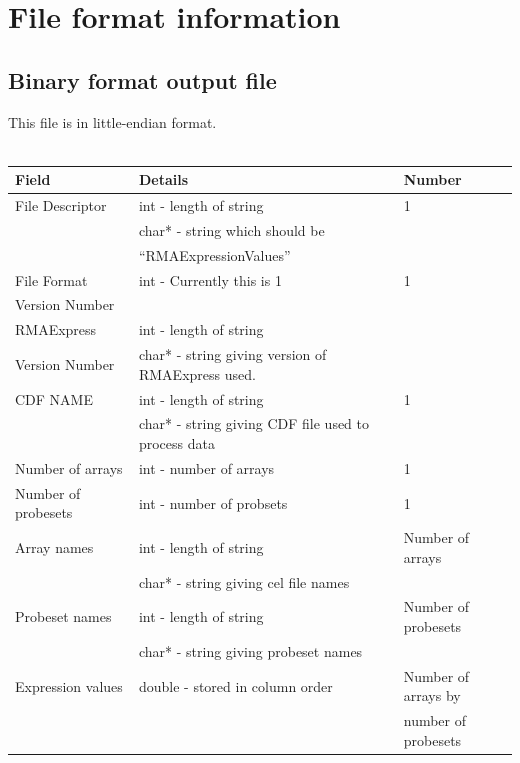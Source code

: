 \documentclass[11pt]{report}
\begin{document}
\chapter{File format information}


\section{Binary format output file}

This file is in little-endian format.
\\
\\
\begin{tabular}{|l|l|l|} \hline
Field & Details & Number \\ \hline
File Descriptor & int - length of string & 1 \\
&     char* - string which should be & \\
& ``RMAExpressionValues'' & \\ \hline
File Format &  int - Currently this is 1               & 1 \\
Version Number &   & \\ \hline 
RMAExpress & int - length of string & \\
Version Number & char* - string giving version of RMAExpress used.  & \\ \hline 
CDF NAME & int - length of string & 1 \\
& char* - string giving CDF file used to process data & \\ \hline
Number of arrays & int - number of arrays & 1 \\ \hline
Number of probesets & int - number of probsets & 1 \\ \hline
Array names & int - length of string & Number of arrays \\
& char* - string giving cel file names & \\ \hline
Probeset names &  int - length of string & Number of probesets \\
& char* - string giving probeset names & \\ \hline
Expression values & double - stored in column order & Number of arrays by\\
                  &                                 & number of probesets \\ \hline
\end{tabular}


  
\end{document}
